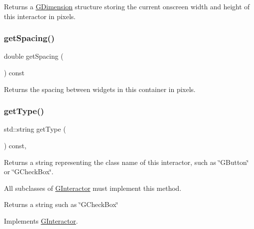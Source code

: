 Returns a \mbox{\hyperlink{structGDimension}{G\+Dimension}} structure storing the current onscreen width and height of this interactor in pixels. 

\mbox{\label{classGContainer_a9a7e859eeff5cc7de46d65b9be7afc3c}} 
\subsubsection{\texorpdfstring{get\+Spacing()}{getSpacing()}}
{\footnotesize\ttfamily double get\+Spacing (\begin{DoxyParamCaption}{ }\end{DoxyParamCaption}) const\hspace{0.3cm}{\ttfamily [virtual]}}



Returns the spacing between widgets in this container in pixels. 

\mbox{\label{classGContainer_a9b72ede4ee8520f987a0c01e30654814}} 
\subsubsection{\texorpdfstring{get\+Type()}{getType()}}
{\footnotesize\ttfamily std\+::string get\+Type (\begin{DoxyParamCaption}{ }\end{DoxyParamCaption}) const\hspace{0.3cm}{\ttfamily [override]}, {\ttfamily [virtual]}}



Returns a string representing the class name of this interactor, such as \char`\"{}\+G\+Button\char`\"{} or \char`\"{}\+G\+Check\+Box\char`\"{}. 

All subclasses of \mbox{\hyperlink{classGInteractor}{G\+Interactor}} must implement this method. \begin{DoxyReturn}{Returns}
a string such as \char`\"{}\+G\+Check\+Box\char`\"{} 
\end{DoxyReturn}


Implements \mbox{\hyperlink{classGInteractor_a44c407a54a20dd0f2fff30338289299d}{G\+Interactor}}.

\mbox{\label{classGContainer_a3b33a602b31a6b809d020535a59db3b4}} 
